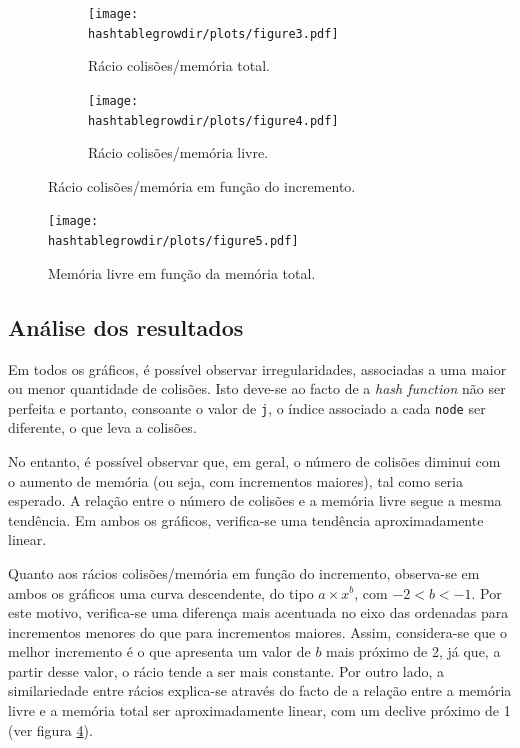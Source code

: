 \documentclass[portuguese,11pt,a4paper,titlepage]{article}
\newcommand{\srcdir}{..}
\newcommand{\hashtablegrowdir}{\srcdir/hash\_table\_grow-test}
\begin{document}
\begin{figure}[h]
	\begin{subfigure}{0.47\textwidth}
		\texttt{[image: \\hashtablegrowdir/plots/figure3.pdf]} 
		\caption{Rácio colisões/memória total.}
		\label{fig:htg_ratio_inc_total}
	\end{subfigure}
	\hspace{0.049\textwidth}
	\begin{subfigure}{0.47\textwidth}
		\texttt{[image: \\hashtablegrowdir/plots/figure4.pdf]}
		\caption{Rácio colisões/memória livre.}
		\label{fig:htg_ratio_inc_free}
	\end{subfigure}
	
	\caption{Rácio colisões/memória em função do incremento.}
	\label{fig:htg_ratio_inc}
\end{figure}

\begin{figure}[ht]
	\centering
	\texttt{[image: \\hashtablegrowdir/plots/figure5.pdf]}
	\caption{Memória livre em função da memória total.}
	\label{fig:htg_free_total}
\end{figure}

\subsection{Análise dos resultados}
Em todos os gráficos, é possível observar irregularidades, associadas a uma maior ou menor quantidade de colisões. Isto deve-se ao facto de a \textit{hash function} não ser perfeita e portanto, consoante o valor de \lstinline|j|, o índice associado a cada \lstinline|node| ser diferente, o que leva a colisões.

No entanto, é possível observar que, em geral, o número de colisões diminui com o aumento de memória (ou seja, com incrementos maiores), tal como seria esperado. A relação entre o número de colisões e a memória livre segue a mesma tendência. Em ambos os gráficos, verifica-se uma tendência aproximadamente linear.

Quanto aos rácios colisões/memória em função do incremento, observa-se em ambos os gráficos uma curva descendente, do tipo \begin{math}a \times x^b\end{math}, com \begin{math}-2 < b < -1\end{math}. Por este motivo, verifica-se uma diferença mais acentuada no eixo das ordenadas para incrementos menores do que para incrementos maiores. Assim, considera-se que o melhor incremento é o que apresenta um valor de \begin{math}b\end{math} mais próximo de 2, já que, a partir desse valor, o rácio tende a ser mais constante. Por outro lado, a similariedade entre rácios explica-se através do facto de a relação entre a memória livre e a memória total ser aproximadamente linear, com um declive próximo de 1 (ver figura \ref{fig:htg_free_total}).
\end{document}
